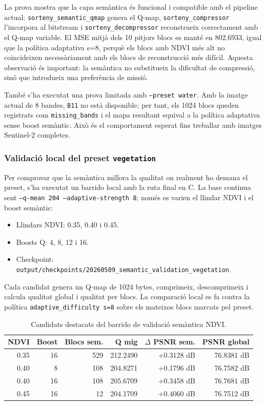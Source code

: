 \documentclass[11pt,a4paper]{article}
\begin{document}
La prova mostra que la capa semàntica és funcional i compatible amb el pipeline actual: \texttt{sorteny\_semantic\_qmap} genera el Q-map, \texttt{sorteny\_compressor} l'incorpora al bitstream i \texttt{sorteny\_decompressor} reconstrueix correctament amb el Q-map variable. El MSE mitjà dels 10 pitjors blocs es manté en 802.6933, igual que la política adaptativa s=8, perquè els blocs amb NDVI més alt no coincideixen necessàriament amb els blocs de reconstrucció més difícil. Aquesta observació és important: la semàntica no substitueix la dificultat de compressió, sinó que introdueix una preferència de missió.

També s'ha executat una prova limitada amb \texttt{--preset water}. Amb la imatge actual de 8 bandes, \texttt{B11} no està disponible; per tant, els 1024 blocs queden registrats com \texttt{missing\_bands} i el mapa resultant equival a la política adaptativa sense boost semàntic. Això és el comportament esperat fins treballar amb imatges Sentinel-2 completes.

\subsubsection{Validació local del preset \texttt{vegetation}}

Per comprovar que la semàntica millora la qualitat on realment ho demana el preset, s'ha executat un barrido local amb la ruta final en C. La base continua sent \texttt{--q-mean 204 --adaptive-strength 8}; només es varien el llindar NDVI i el boost semàntic:

\begin{itemize}
  \item Llindars NDVI: 0.35, 0.40 i 0.45.
  \item Boosts Q: 4, 8, 12 i 16.
  \item Checkpoint: \texttt{output/checkpoints/20260509\_semantic\_validation\_vegetation}.
\end{itemize}

Cada candidat genera un Q-map de 1024 bytes, comprimeix, descomprimeix i calcula qualitat global i qualitat per blocs. La comparació local es fa contra la política \texttt{adaptive\_difficulty s=8} sobre els mateixos blocs marcats pel preset.

\begin{table}[H]
\centering
\begin{tabular}{rrrrrr}
\toprule
\textbf{NDVI} & \textbf{Boost} & \textbf{Blocs sem.} & \textbf{Q mig} & \textbf{$\Delta$ PSNR sem.} & \textbf{PSNR global} \\
\midrule
0.35 & 16 & 529 & 212.2490 & +0.3128 dB & 76.8381 dB \\
0.40 & 8 & 108 & 204.8271 & +0.1796 dB & 76.7582 dB \\
0.40 & 16 & 108 & 205.6709 & +0.3458 dB & 76.7681 dB \\
0.45 & 16 & 12 & 204.1709 & +0.4060 dB & 76.7512 dB \\
\bottomrule
\end{tabular}
\caption{Candidats destacats del barrido de validació semàntica NDVI.}
\end{table}
\end{document}
